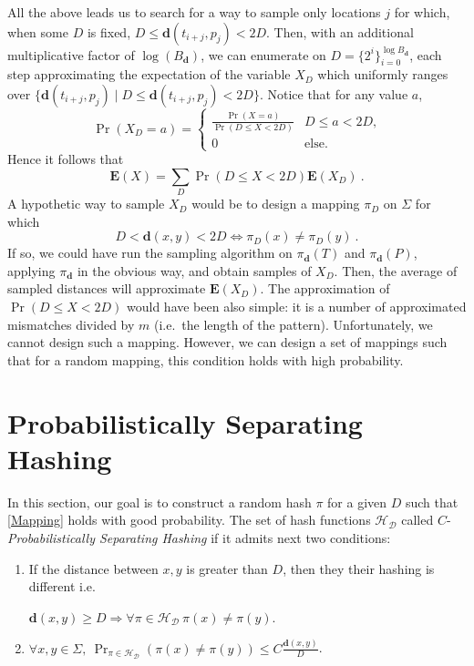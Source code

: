 \documentclass[11pt]{article}
\newcommand{\bfE}{\textbf{E}}
\newcommand{\dist}{\textbf{d}}
\begin{document}
All the above leads us to search for a way to sample only
locations $j$ for which, when some $D$ is fixed, $D \leq
\dist(t_{i+j},p_j)<2D$. Then, with an additional multiplicative
factor of $\log(B_{\dist})$, we can enumerate on
$D=\{2^i\}_{i=0}^{\log{B_{\dist}}}$, each step approximating the
expectation of the variable $X_D$ which uniformly ranges over $\{
\dist(t_{i+j},p_j) \mid  D \leq \dist(t_{i+j},p_j) < 2D\}$. Notice
that for any value $a$,
\[
   \Pr(X_D=a)=
     \begin{cases}
     \frac{\Pr(X=a)}{\Pr(D\leq X<2D)} & D\leq a <2D\mbox{,} \\
     0              & \mbox{else}.
     \end{cases}
\]
Hence it follows that
$$\bfE(X)=\sum_D \Pr(D\leq X <2D)\bfE(X_D)\ .$$
A hypothetic way to sample $X_D$ would be to design a mapping
$\pi_D$ on $\Sigma$ for which
\begin{equation} \label{Mapping}
D<\dist(x,y)<2D \iff \pi_D(x) \neq \pi_D(y)\ .
\end{equation}
If so, we could have run the sampling algorithm on
$\pi_{\dist}(T)$ and $\pi_{\dist}(P)$, applying $\pi_{\dist}$ in
the obvious way, and obtain samples of $X_D$. Then, the average of
sampled distances will approximate $\bfE(X_D)$. The approximation
of $\Pr(D\leq X <2D)$ would have been also simple: it is a number
of approximated mismatches divided by $m$ (i.e.\ the length of the
pattern). Unfortunately, we cannot design such a mapping. However,
we can design a set of mappings such that for a random mapping,
this condition holds with high probability.



\section{Probabilistically Separating Hashing} \label{s:mapping}
 In this section, our goal is to construct a random
hash $\pi$ for a given $D$ such that \eqref{Mapping} holds with
good probability. The set of hash functions $\mathcal{H_D}$ called
$C$-\emph{Probabilistically Separating Hashing }if it admits next
two conditions:
\begin{enumerate}
\item If the distance between $x,y$ is greater than $D$, then they
their hashing is different  i.e.\

  $\dist(x,y)\geq D \Rightarrow
  \forall \pi \in \mathcal{H_D}\ \pi(x)\neq \pi(y)$.
\item  $\forall x,y\in \Sigma,\ \Pr_{\pi \in \mathcal{H_D} }(\pi(x)\neq \pi(y)) \leq
  C\frac{\dist(x,y)}{D}$.
\end{enumerate}
\end{document}
